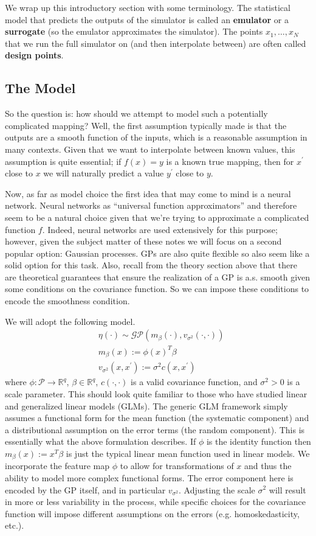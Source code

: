 \documentclass[12pt]{article}
\newcommand{\R}{\mathcal{R}}
\def\R{\mathbb{R}}
\begin{document}
We wrap up this introductory section with some terminology. The statistical model that predicts the outputs of the simulator is called an \textbf{emulator} or a \textbf{surrogate}
(so the emulator approximates the simulator). The points $x_1, \dots, x_N$ that we run the full simulator on (and then interpolate between) are often called \textbf{design points}. 

\subsection{The Model}
So the question is: how should we attempt to model such a potentially complicated mapping? Well, the first assumption typically made is that the outputs are a smooth function
of the inputs, which is a reasonable assumption in many contexts. Given that we want to interpolate between known values, this assumption is quite essential; if $f(x) = y$ is a known 
true mapping, then for $x^\prime$ close to $x$ we will naturally predict a value $y^\prime$ close to $y$. 

Now, as far as model choice the first idea that may come to mind is a neural network. Neural networks as ``universal function approximators'' and therefore seem to be a natural choice
given that we're trying to approximate a complicated function $f$. Indeed, neural networks are used extensively for this purpose; however, given the subject matter of these notes we will 
focus on a second popular option: Gaussian processes. GPs are also quite flexible so also seem like a solid option for this task. Also, recall from the theory section above that there are 
theoretical guarantees that ensure the realization of a GP is a.s. smooth given some conditions on the covariance function. So we can impose these conditions to encode the smoothness 
condition. 

We will adopt the following model. 
\begin{align*}
&\eta(\cdot) \sim \mathcal{GP}(m_\beta (\cdot), v_{\sigma^2}(\cdot, \cdot)) \\
&m_\beta (x) := \phi(x)^T \beta \\
&v_{\sigma^2}(x, x^\prime) := \sigma^2 c(x, x^\prime)
\end{align*}
where $\phi: \mathcal{P} \to \R^q$, $\beta \in \R^q$, $c(\cdot, \cdot)$ is a valid covariance function, and $\sigma^2 > 0$ is a scale parameter. 
This should look quite familiar to those who have studied linear and generalized linear models (GLMs). The generic GLM framework simply assumes a functional form for the mean function
(the systematic component) and a distributional assumption on the error terms (the random component). This is essentially what the above formulation describes. If $\phi$ is the identity function
then $m_\beta (x) := x^T \beta$ is just the typical linear mean function used in linear models. We incorporate the feature map $\phi$ to allow for transformations of $x$ and thus the ability to 
model more complex functional forms. The error component here is encoded by the GP itself, and in particular $v_{\sigma^2}$. Adjusting the scale $\sigma^2$ will result in more or less 
variability in the process, while specific choices for the covariance function will impose different assumptions on the errors (e.g. homoskedasticity, etc.). 
\end{document}
